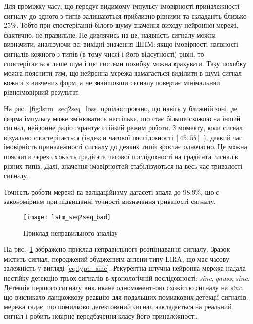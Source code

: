 Для проміжку часу, що передує видимому імпульсу імовірності приналежності 
сигналу до одного з типів залишаються 
приблизно рівними та складають близько $ 25 \% $. Тобто при спостеріганні 
білого шуму значення виходу нейронної мережі, фактично, не правильне. Не 
дивлячись на це, наявність сигналу можна визначити, аналізуючи всі вихідні 
значення ШНМ: якщо імовірності наявності сигналів кожного з типів (в тому 
числі і його відсутності) рівні, то спостерігається лише шум і цю системн 
похибку можна врахувати. Таку похибку можна пояснити тим, що нейронна мережа 
намагається виділити в шумі сигнал кожної з вивчених форм, а не знайшовши 
сигналу повертає мінімальний рівноімовірний результат.

На рис.~\ref{fig:lstm_seq2seq_loss} проілюстровано, що навіть у ближній зоні, 
де форма імпульсу може змінюватись настільки, що стає більше схожою на інший 
сигнал, нейронне радіо гарантує стійкий режим роботи. З моменту, коли сигнал 
візуально спостерігається (індекси часової послідовності 
$ \left[ 45, 55 \right]$ ), деякий час імовірність приналежності сигналу до 
деяких типів зростає одночасно. Це можна пояснити через схожість 
градієнта часової послідовності на градієнта сигналів різних типів. Далі,
значення імовірностей стабілізуються на весь час тривалості сигналу.

Точність роботи мережі на валідаційному датасеті впала до $ 98.9\% $,
що є закономірним при підвищенні точності визначення тривалості сигналу.

\begin{figure}[htbp] \begin{center}
\texttt{[image: lstm\_seq2seq\_bad]}
\caption{Приклад неправильного аналізу} \label{fig:lstm_seq2seq_bad}
\end{center} \end{figure}

На рис.~\ref{fig:lstm_seq2seq_bad} зображено приклад неправильного
розпізнавання сигналу. Зразок містить сигнал, породжений збудженням антени 
типу LIRA, що має часову залежність у вигляді \eqref{eq:type_sinc}. 
Рекурентна штучна нейронна мережа надала нестійку
детекцію трьох сигналів в хронологічній послідовності: \textit{sinc}, 
\textit{gauss}, \textit{sinc}. Детекція першого сигналу викликана 
одномоментною схожістю сигналу на \textit{sinc}, що викликало ланцюжкову 
реакцію для подальших помилкових детекції сигналів: мережа гадає, що 
помилково детектований сигнал накладається на реальний сигнал і робить 
невірне передбачення класу його приналежності.

